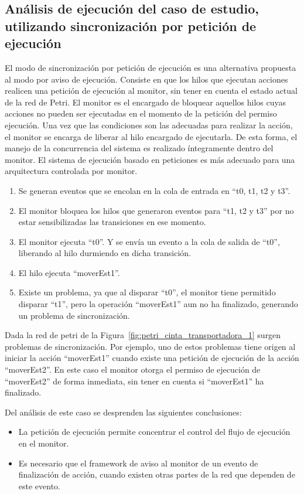 \subsection{Análisis de ejecución del caso de estudio, utilizando
sincronización por petición de ejecución}
\label{sec:sincronizacion_peticion_ejecucion}
 El modo de sincronización por petición de ejecución es una alternativa
 propuesta al modo por aviso de ejecución.
 Consiste en que los hilos que ejecutan acciones realicen una petición de ejecución al
 monitor, sin tener en cuenta el estado actual de la red de Petri.
 El monitor es el encargado de bloquear aquellos hilos cuyas acciones no
 pueden ser ejecutadas en el momento de la petición del permiso ejecución. Una
 vez que las condiciones son las adecuadas para realizar la acción, el monitor
 se encarga de liberar al hilo encargado de ejecutarla.
 De esta forma, el manejo de la concurrencia del sistema es realizado
 íntegramente dentro del monitor. El sistema de ejecución basado en
 peticiones es más adecuado para una arquitectura controlada por monitor. 

\begin{enumerate}
    \item Se generan eventos que se encolan en la cola de entrada en “t0, t1,
    	t2 y t3”.
    \item El monitor bloquea los hilos que generaron eventos para “t1, t2 y t3”
    	por no estar sensibilizadas las transiciones en ese momento.
    \item El monitor ejecuta “t0”. Y se envía un evento a la cola de salida de
    	“t0”, liberando al hilo durmiendo en dicha transición.
    \item El hilo ejecuta “moverEst1”.
    \item Existe un problema, ya que al disparar “t0”, el monitor tiene
    	permitido disparar “t1”, pero la operación “moverEst1” aun no ha
    	finalizado, generando un problema de sincronización.
\end{enumerate}

Dada la red de petri de la Figura~\ref{fig:petri_cinta_transportadora_1}
surgen problemas de sincronización. Por ejemplo, uno de estos problemas
tiene origen al iniciar la acción ``moverEst1'' cuando existe una petición
de ejecución de la acción “moverEst2”. En este caso el monitor otorga el permiso
de ejecución de “moverEst2” de forma inmediata, sin tener en cuenta si
``moverEst1'' ha finalizado.

Del análisis de este caso se desprenden las siguientes conclusiones:
\begin {itemize}
  \item La petición de ejecución permite concentrar el control del flujo de
  	ejecución en el monitor.
  \item Es necesario que el framework de aviso al
	monitor de un evento de finalización de acción, cuando existen otras partes de
	la red que dependen de este evento.
\end{itemize}

